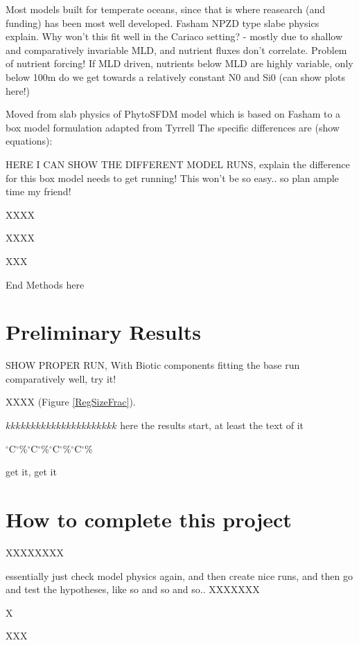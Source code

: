 Most models built for temperate oceans, since that is where reasearch (and funding) has been most well developed. Fasham NPZD type slabe physics explain.
Why won't this fit well in the Cariaco setting? - mostly due to shallow and comparatively invariable MLD, and nutrient fluxes don't correlate.
Problem of nutrient forcing! If MLD driven, nutrients below MLD are highly variable, only below 100m do we get towards a relatively constant N0 and Si0 (can show plots here!)

Moved from slab physics of PhytoSFDM model \citep{Acevedo-Trejos2016} which is based on Fasham \citep{Evans2003,Fasham1990a} to a box model formulation adapted from Tyrrell \citep{Tyrrell1999}
The specific differences are (show equations):

HERE I CAN SHOW THE DIFFERENT MODEL RUNS, explain the difference
for this box model needs to get running! This won't be so easy.. so plan ample time my friend!

XXXX

XXXX

XXX


End Methods here

\section{Preliminary Results}


SHOW PROPER RUN, With Biotic components fitting the base run comparatively well, try it!

XXXX (Figure \ref{RegSizeFrac}).



$kkkkkkkkkkkkkkkkkkkkkk$ here the results start, at least the text of it

$^{\circ}$C$^{\circ}$\%$^{\circ}$C$^{\circ}$\%$^{\circ}$C$^{\circ}$\%$^{\circ}$C$^{\circ}$\%


get it, get it


\section{How to complete this project}
XXXXXXXX

essentially just check model physics again, and then
create nice runs, and then go and test the hypotheses, like so and so and so..
XXXXXXX

X

XXX

